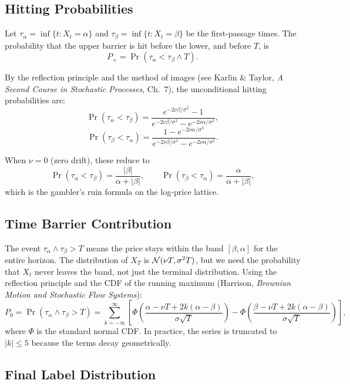 \subsection{Hitting Probabilities}

Let $\tau_\alpha = \inf\{t : X_t = \alpha\}$ and $\tau_\beta = \inf\{t :
X_t = \beta\}$ be the first-passage times. The probability that the
upper barrier is hit before the lower, and before $T$, is
\[
P_+ = \Pr(\tau_\alpha < \tau_\beta \wedge T).
\]

By the reflection principle and the method of images (see Karlin \&
Taylor, \emph{A Second Course in Stochastic Processes}, Ch.~7), the
unconditional hitting probabilities are:
\[
\Pr(\tau_\alpha < \tau_\beta) = \frac{e^{-2 \nu \beta / \sigma^2} - 1}{e^{-2 \nu \beta / \sigma^2} - e^{-2 \nu \alpha / \sigma^2}},
\]
\[
\Pr(\tau_\beta < \tau_\alpha) = \frac{1 - e^{-2 \nu \alpha / \sigma^2}}{e^{-2 \nu \beta / \sigma^2} - e^{-2 \nu \alpha / \sigma^2}}.
\]

When $\nu = 0$ (zero drift), these reduce to
\[
\Pr(\tau_\alpha < \tau_\beta) = \frac{|\beta|}{\alpha + |\beta|}, \qquad
\Pr(\tau_\beta < \tau_\alpha) = \frac{\alpha}{\alpha + |\beta|},
\]
which is the gambler's ruin formula on the log-price lattice.

\subsection{Time Barrier Contribution}

The event $\tau_\alpha \wedge \tau_\beta > T$ means the price stays
within the band $[\beta, \alpha]$ for the entire horizon. The
distribution of $X_T$ is $\mathcal{N}(\nu T, \sigma^2 T)$, but we need the
probability that $X_t$ never leaves the band, not just the terminal
distribution. Using the reflection principle and the CDF of the running
maximum (Harrison, \emph{Brownian Motion and Stochastic Flow Systems}):
\[
P_0 = \Pr(\tau_\alpha \wedge \tau_\beta > T) = \sum_{k=-\infty}^{\infty} \left[ \Phi\!\left(\frac{\alpha - \nu T + 2 k (\alpha - \beta)}{\sigma \sqrt{T}}\right) - \Phi\!\left(\frac{\beta - \nu T + 2 k (\alpha - \beta)}{\sigma \sqrt{T}}\right) \right],
\]
where $\Phi$ is the standard normal CDF. In practice, the series is
truncated to $|k| \le 5$ because the terms decay geometrically.

\subsection{Final Label Distribution}

